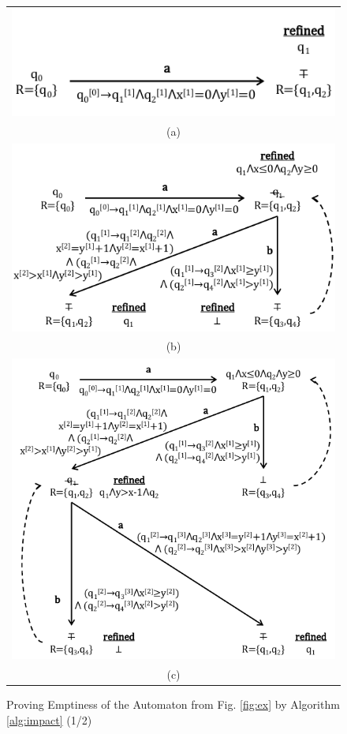 \documentclass[10pt,conference,letterpaper,twocolumn]{IEEEtran}
\begin{document}
\begin{figure}[htb]
\vspace*{-\baselineskip}
\begin{tabular}{c}
\includegraphics[scale=0.65]{IM1.pdf} \\
\tiny{(a)} \\
\includegraphics[scale=0.65]{IM2.pdf} \\[-2mm]
\tiny{(b)} \\
\includegraphics[scale=0.65]{IM3.pdf} \\[-2mm]
\tiny{(c)}
\end{tabular}
\vspace*{-0.5\baselineskip}
\caption{Proving Emptiness of the Automaton from Fig. \ref{fig:ex}
  by Algorithm \ref{alg:impact} (1/2)}
\label{fig:im1}
\vspace*{-\baselineskip}
\end{figure}
\end{document}
